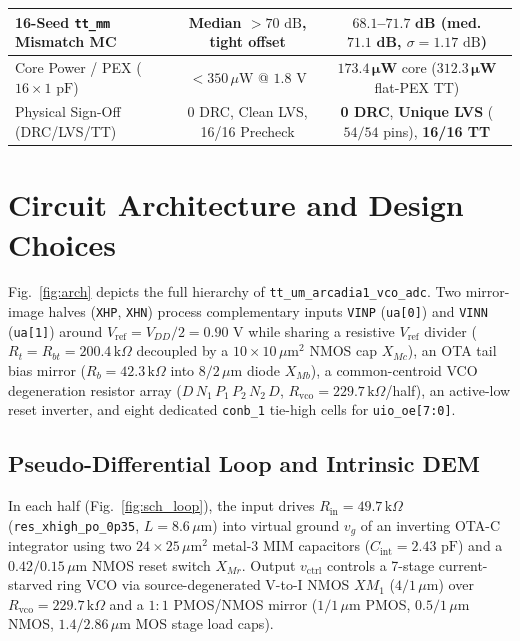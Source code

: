 \documentclass[10pt,twocolumn,letterpaper]{article}
\begin{document}
\begin{table}[b]
\begin{tabular}{@{}lcc@{}}
16-Seed \texttt{tt\_mm} Mismatch MC & Median $>70\text{ dB}$, tight offset & $\mathbf{68.1}$--$\mathbf{71.7\text{ dB}}$ (med. $\mathbf{71.1\text{ dB}}$, $\sigma=1.17\text{ dB}$) \\
\midrule
Core Power / PEX ($16\times1\text{ pF}$) & $<350\,\mu\text{W}$ @ $1.8\text{ V}$ & $\mathbf{173.4\,\mu\text{W}}$ core ($\mathbf{312.3\,\mu\text{W}}$ flat-PEX TT) \\
Physical Sign-Off (DRC/LVS/TT) & 0 DRC, Clean LVS, 16/16 Precheck & \textcolor{okgreen}{\textbf{0 DRC}}, \textcolor{okgreen}{\textbf{Unique LVS}} ($54/54$ pins), \textcolor{okgreen}{\textbf{16/16 TT}} \\
\bottomrule
\end{tabular}
\end{table}

\section{Circuit Architecture and Design Choices}
Fig.~\ref{fig:arch} depicts the full hierarchy of \texttt{tt\_um\_arcadia1\_vco\_adc}. Two mirror-image halves (\texttt{XHP}, \texttt{XHN}) process complementary inputs \texttt{VINP} (\texttt{ua[0]}) and \texttt{VINN} (\texttt{ua[1]}) around $V_{\text{ref}}=V_{DD}/2=0.90\text{ V}$ while sharing a resistive $V_{\text{ref}}$ divider ($R_t=R_{bt}=200.4\,\text{k}\Omega$ decoupled by a $10\times10\,\mu\text{m}^2$ NMOS cap $X_{Mc}$), an OTA tail bias mirror ($R_b=42.3\,\text{k}\Omega$ into $8/2\,\mu\text{m}$ diode $X_{Mb}$), a common-centroid VCO degeneration resistor array ($D\,N_1\,P_1\,P_2\,N_2\,D$, $R_{\text{vco}}=229.7\,\text{k}\Omega$/half), an active-low reset inverter, and eight dedicated \texttt{conb\_1} tie-high cells for \texttt{uio\_oe[7:0]}.

\subsection{Pseudo-Differential Loop and Intrinsic DEM}
In each half (Fig.~\ref{fig:sch_loop}), the input drives $R_{\text{in}}=49.7\,\text{k}\Omega$ (\texttt{res\_xhigh\_po\_0p35}, $L=8.6\,\mu\text{m}$) into virtual ground $v_g$ of an inverting OTA-C integrator using two $24\times25\,\mu\text{m}^2$ metal-3 MIM capacitors ($C_{\text{int}}=2.43\text{ pF}$) and a $0.42/0.15\,\mu\text{m}$ NMOS reset switch $X_{Mr}$. Output $v_{\text{ctrl}}$ controls a 7-stage current-starved ring VCO via source-degenerated V-to-I NMOS $XM_1$ ($4/1\,\mu\text{m}$) over $R_{\text{vco}}=229.7\,\text{k}\Omega$ and a $1{:}1$ PMOS/NMOS mirror ($1/1\,\mu\text{m}$ PMOS, $0.5/1\,\mu\text{m}$ NMOS, $1.4/2.86\,\mu\text{m}$ MOS stage load caps).
\end{document}
